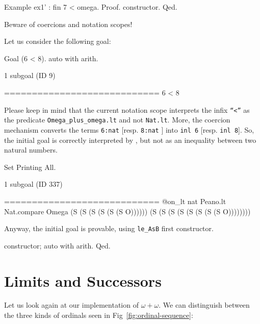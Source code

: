 \begin{Coqsrc}
Example ex1' : fin 7 < omega.
Proof. constructor. Qed.
\end{Coqsrc}



\begin{remark}
Beware of coercions and notation scopes!

Let us consider the following goal:

\begin{Coqsrc}
 Goal (6 < 8).
 auto with arith.
\end{Coqsrc}


\begin{Coqanswer}
1 subgoal (ID 9)
  
  ============================
  6 < 8
\end{Coqanswer}

Please keep in mind that the current notation scope interprets the infix \texttt{``<''} as the predicate \texttt{Omega\_plus\_omega.lt} and not \texttt{Nat.lt}. More,  the coercion mechanism converts the terms \texttt{6:nat} [resp. \texttt{8:nat} ]
into \texttt{inl 6} [resp. \texttt{inl 8}].  So, the initial goal is correctly interpreted by \coq{}, but not as an inequality between two natural numbers.


\begin{Coqsrc}
Set Printing All.
\end{Coqsrc}

\begin{Coqanswer}
1 subgoal (ID 337)
  
  ============================
  @on_lt nat Peano.lt Nat.compare Omega (S (S (S (S (S (S O))))))
    (S (S (S (S (S (S (S (S O))))))))
\end{Coqanswer}


Anyway, the initial goal is provable, using \texttt{le\_AsB} first constructor.

\begin{Coqsrc}
  constructor; auto with arith.
Qed.
\end{Coqsrc}

\end{remark}


\section{Limits and Successors}

Let us look again at our implementation of $\omega+\omega$. We can distinguish between the three kinds of ordinals seen in Fig~\ref{fig:ordinal-sequence}:

